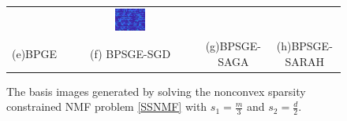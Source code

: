 \documentclass[letterpaper]{article} %
\begin{document}
\begin{figure}[!ht]
\begin{tabular}{cccc}
			&\includegraphics[width=0.24\textwidth]{figs/ORL_32_BPSGE_SARAH}\\
			(e)BPGE&(f) BPSGE-SGD&(g)BPSGE-SAGA&(h)BPSGE-SARAH
		\end{tabular}
		\caption{The basis images generated by solving the nonconvex sparsity constrained NMF problem \eqref{SSNMF}  with $s_{1}=\frac{m}{3}$ and $s_{2}=\frac{d}{2}$.}
		\label{basis_SSNMF_ORL_32}
	\end{figure}
	
\end{document}
